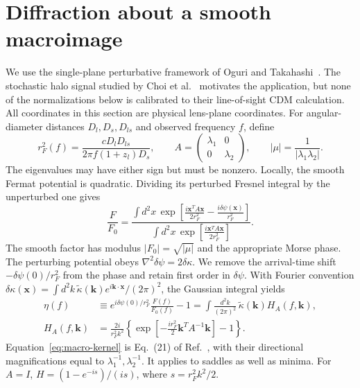 \section{Diffraction about a smooth macroimage}

We use the single-plane perturbative framework of
Oguri and Takahashi~\cite{oguri2022}.  The stochastic halo signal studied
by Choi et al.~\cite{choi2026} motivates the application, but none of the
normalizations below is calibrated to their line-of-sight CDM calculation.
All coordinates in this section are physical lens-plane coordinates.
For angular-diameter distances $D_l,D_s,D_{ls}$ and observed frequency $f$,
define
\begin{equation}
 r_F^2(f)=\frac{cD_lD_{ls}}{2\pi f(1+z_l)D_s},\qquad
 A=\begin{pmatrix}\lambda_1&0\\0&\lambda_2\end{pmatrix},\qquad
 |\mu|=\frac{1}{|\lambda_1\lambda_2|}.
\end{equation}
The eigenvalues may have either sign but must be nonzero.  Locally, the
smooth Fermat potential is quadratic.  Dividing its perturbed Fresnel
integral by the unperturbed one gives
\begin{equation}
 \frac{F}{F_0}=
 \frac{\displaystyle\int d^2x\,
  \exp\left[\frac{i\boldsymbol{x}^{T}A\boldsymbol{x}}{2r_F^2}
                -\frac{i\delta\psi(\boldsymbol{x})}{r_F^2}\right]}
 {\displaystyle\int d^2x\,
  \exp\left[\frac{i\boldsymbol{x}^{T}A\boldsymbol{x}}{2r_F^2}\right]}.
 \label{eq:macro-fresnel}
\end{equation}
The smooth factor has modulus $|F_0|=\sqrt{|\mu|}$ and the appropriate
Morse phase.  The perturbing potential obeys
$\nabla^2\delta\psi=2\delta\kappa$.
We remove the arrival-time shift $-\delta\psi(0)/r_F^2$ from the phase
and retain first order in $\delta\psi$.  With Fourier convention
$\delta\kappa(\boldsymbol{x})=
\int d^2k\,\widetilde\kappa(\boldsymbol{k})
e^{i\boldsymbol{k}\cdot\boldsymbol{x}}/(2\pi)^2$,
the Gaussian integral yields
\begin{align}
 \eta(f)&\equiv e^{i\delta\psi(0)/r_F^2}\frac{F(f)}{F_0(f)}-1
 =\int\frac{d^2k}{(2\pi)^2}\,
 \widetilde\kappa(\boldsymbol{k}) H_A(f,\boldsymbol{k}),\\
 H_A(f,\boldsymbol{k})&=
 \frac{2i}{r_F^2 k^2}
 \left\{\exp\left[-\frac{i r_F^2}{2}
 \boldsymbol{k}^{T}A^{-1}\boldsymbol{k}\right]-1\right\}.
 \label{eq:macro-kernel}
\end{align}
Equation~\eqref{eq:macro-kernel} is Eq.~(21) of
Ref.~\cite{oguri2022}, with their directional magnifications equal to
$\lambda_1^{-1},\lambda_2^{-1}$.  It applies to saddles as well as minima.
For $A=I$, $H=(1-e^{-is})/(is)$, where $s=r_F^2 k^2/2$.

